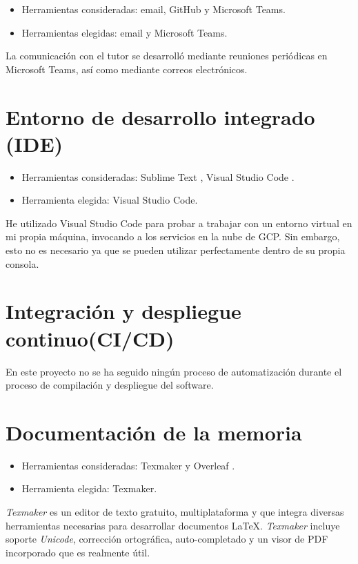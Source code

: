 \begin{itemize}
\tightlist
\item
  Herramientas consideradas: email, GitHub y Microsoft Teams.
\item
  Herramientas elegidas: email y Microsoft Teams. 
\end{itemize}

La comunicación con el tutor se desarrolló mediante reuniones periódicas en Microsoft Teams, así como mediante correos electrónicos.  

\section{Entorno de desarrollo integrado (IDE)}\label{ide}
\begin{itemize}
\tightlist
\item
  Herramientas consideradas: Sublime Text \citep{online:sublime}, Visual Studio Code \citep{online:vs_code}.
\item
  Herramienta elegida: Visual Studio Code. 
\end{itemize}

He utilizado Visual Studio Code para probar a trabajar con un entorno virtual en mi propia máquina, invocando a los servicios en la nube de GCP. Sin embargo, esto no es necesario ya que se pueden utilizar perfectamente dentro de su propia consola.

\section{Integración y despliegue continuo(CI/CD)}
En este proyecto no se ha seguido ningún proceso de automatización durante el proceso de compilación y despliegue del software. 

\section{Documentación de la memoria}\label{editor_texto}
\begin{itemize}
\tightlist
\item
  Herramientas consideradas: Texmaker \citep{online:texmaker} y Overleaf \citep{online:overleaf}.
\item
  Herramienta elegida: Texmaker. 
\end{itemize}

\emph{Texmaker} es un editor de texto gratuito, multiplataforma y que integra diversas
herramientas necesarias para desarrollar documentos \LaTeX. \emph{Texmaker} incluye soporte 
\emph{Unicode}, corrección ortográfica, auto-completado y un visor de PDF incorporado que es
realmente útil. 

